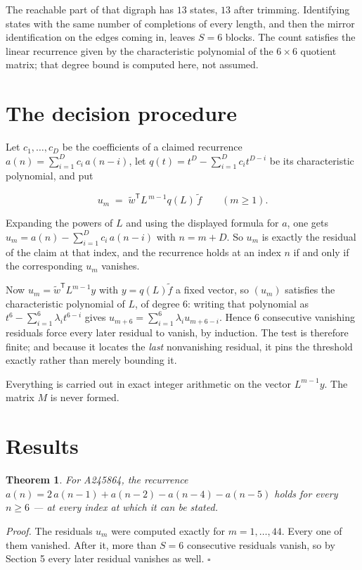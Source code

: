 \documentclass[11pt]{article}
\newtheorem{theorem}{Theorem}
\theoremstyle{definition}
\begin{document}
The reachable part of that digraph has $13$ states, $13$ after trimming. Identifying states with the same number of completions of every length, and then the mirror identification on the edges coming in, leaves $S = 6$ blocks. The count satisfies the linear recurrence given by the characteristic polynomial of the $6\times6$ quotient matrix; that degree bound is computed here, not assumed.

\section{The decision procedure}

Let $c_1,\dots,c_D$ be the coefficients of a claimed recurrence $a(n) = \sum_{i=1}^{D} c_i\,a(n-i)$, let $q(t) = t^{D} - \sum_{i=1}^{D} c_i t^{D-i}$ be its characteristic polynomial, and put

\[u_m \;=\; \tilde w^{\mathsf T} L^{\,m-1} q(L)\,\tilde f \qquad (m \ge 1).\]

Expanding the powers of $L$ and using the displayed formula for $a$, one gets $u_m = a(n) - \sum_{i=1}^{D} c_i\,a(n-i)$ with $n = m + D$. So $u_m$ is exactly the residual of the claim at that index, and the recurrence holds at an index $n$ if and only if the corresponding $u_m$ vanishes.

Now $u_m = \tilde w^{\mathsf T} L^{m-1} y$ with $y = q(L)\tilde f$ a fixed vector, so $(u_m)$ satisfies the characteristic polynomial of $L$, of degree $6$: writing that polynomial as $t^{6} - \sum_{i=1}^{6} \lambda_i t^{6-i}$ gives $u_{m+6} = \sum_{i=1}^{6} \lambda_i u_{m+6-i}$. Hence $6$ consecutive vanishing residuals force every later residual to vanish, by induction. The test is therefore finite; and because it locates the {\itshape last} nonvanishing residual, it pins the threshold exactly rather than merely bounding it.

Everything is carried out in exact integer arithmetic on the vector $L^{m-1}y$. The matrix $M$ is never formed.

\section{Results}

\begin{theorem} For A245864, the recurrence $a(n) = 2\,a(n-1) + a(n-2) - a(n-4) - a(n-5)$ holds for every $n \ge 6$ --- at every index at which it can be stated.\end{theorem}

{\itshape Proof.} The residuals $u_m$ were computed exactly for $m = 1,\dots,44$. Every one of them vanished. After it, more than $S = 6$ consecutive residuals vanish, so by Section 5 every later residual vanishes as well. $\square$
\end{document}
